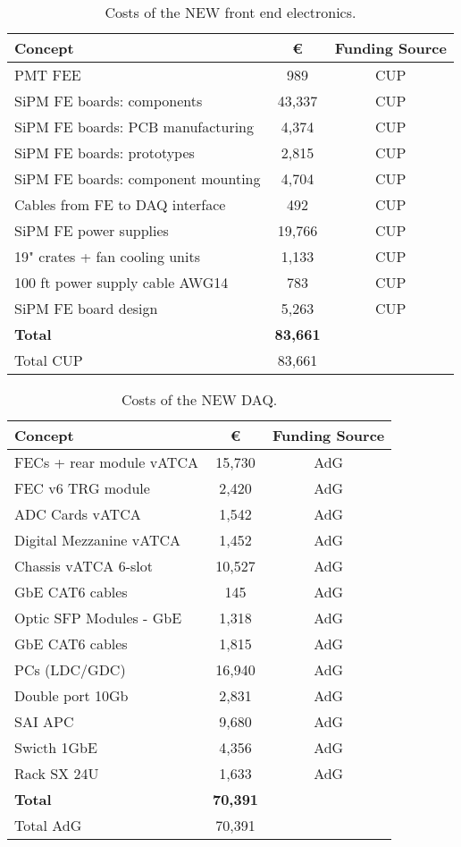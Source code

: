 \begin{table}[h!]
\begin{center}
\begin{tabular}{|l|c|c|}
\hline
 Concept & \euro & Funding Source \\
 \hline
 PMT FEE & 989 & CUP \\
 SiPM FE boards:  components	&	43,337 & CUP \\
SiPM FE boards: PCB manufacturing &	4,374 & CUP \\
SiPM FE boards: prototypes &	2,815 & CUP \\
SiPM FE boards: component mounting &	4,704 & CUP \\
Cables from FE to DAQ interface &	492 & CUP \\
SiPM FE power supplies & 19,766 & CUP \\
19" crates + fan cooling units	& 1,133 & CUP \\
100 ft power supply cable AWG14 &	783 & CUP \\
SiPM FE board design &	5,263 & CUP \\
  \hline
{\bf Total}	&	{\bf 83,661}	& \\
 Total CUP	&	83,661	& \\
 \hline\hline
\end{tabular}  
\caption{Costs of the NEW front end electronics.}
\label{tab.new:FEE}
\end{center}
\end{table} 

\begin{table}[h!]
\begin{center}
\begin{tabular}{|l|c|c|}
\hline
 Concept & \euro & Funding Source \\
 \hline
FECs + rear module vATCA &	15,730 & AdG \\
FEC v6 TRG module		&	2,420 & AdG \\
ADC Cards vATCA & 	1,542 & AdG \\
Digital Mezzanine vATCA & 1,452 & AdG \\
Chassis vATCA 6-slot	&	10,527 & AdG \\
GbE CAT6 cables		& 145 & AdG \\
Optic SFP Modules - GbE	& 1,318 & AdG \\
GbE CAT6 cables &	1,815 & AdG \\
PCs (LDC/GDC) & 16,940 & AdG \\
Double port 10Gb &	2,831 & AdG \\
SAI	APC	&	9,680 & AdG \\
Swicth 1GbE	& 4,356& AdG \\
Rack SX 24U & 1,633 & AdG \\
  \hline
{\bf Total} &	{\bf 70,391}	& \\
 Total AdG	&	70,391	& \\
 \hline\hline
\end{tabular}  
\caption{Costs of the NEW DAQ.}
\label{tab.new:DAQ}
\end{center}
\end{table} 



